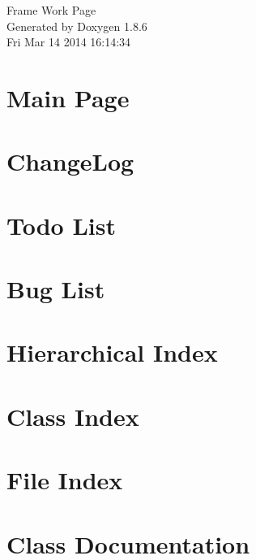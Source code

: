 \documentclass[twoside]{article}
\begin{document}
\hypersetup{pageanchor=false}
\begin{titlepage}
\vspace*{7cm}
\begin{center}%
{\Large Frame Work Page }\\
\vspace*{1cm}
{\large Generated by Doxygen 1.8.6}\\
\vspace*{0.5cm}
{\small Fri Mar 14 2014 16:14:34}\\
\end{center}
\end{titlepage}
\tableofcontents
{}
\hypersetup{pageanchor=true}

\section{Main Page}
\label{index}\hypertarget{index}{}
\section{Change\-Log}
\label{md_ChangeLog}
\hypertarget{md_ChangeLog}{}

\section{Todo List}
\label{todo}
\hypertarget{todo}{}

\section{Bug List}
\label{bug}
\hypertarget{bug}{}

\section{Hierarchical Index}

\section{Class Index}

\section{File Index}

\section{Class Documentation}































\end{document}
